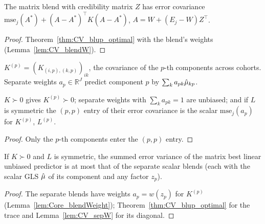 \begin{theorem}\label{thm:CV_blend_price}
  \leanok
  The matrix blend with credibility matrix $Z$ has error covariance
  $\mathrm{mse}_j(A^\ast) + (A - A^\ast)^\top K(A - A^\ast)$, $A = W + (E_j - W)Z^\top$.
\end{theorem}
\begin{proof}
  \leanok
  Theorem~\ref{thm:CV_blup_optimal} with the blend's weights (Lemma~\ref{lem:CV_blendW}).
\end{proof}

\begin{definition}\label{def:CV_sepW}
  \leanok
  $K^{(p)} = (K_{(i,p),(k,p)})_{ik}$, the covariance of the $p$-th components across
  cohorts. Separate weights $a_p \in \mathbb{R}^J$ predict component $p$ by
  $\sum_k a_{pk}\hat\mu_{kp}$.
\end{definition}

\begin{lemma}\label{lem:CV_sepW}
  \leanok
  $K \succ 0$ gives $K^{(p)} \succ 0$; separate weights with $\sum_k a_{pk} = 1$ are
  unbiased; and if $L$ is symmetric the $(p,p)$ entry of their error covariance is the
  scalar $\mathrm{mse}_j(a_p)$ for $K^{(p)}$, $L^{(p)}$.
\end{lemma}
\begin{proof}
  \leanok
  Only the $p$-th components enter the $(p,p)$ entry.
\end{proof}

\begin{theorem}\label{thm:CV_beats_separate}
  \leanok
  If $K \succ 0$ and $L$ is symmetric, the summed error variance of the matrix best linear
  unbiased predictor is at most that of the separate scalar blends (each with the scalar
  GLS $\hat\mu$ of its component and any factor $z_p$).
\end{theorem}
\begin{proof}
  \leanok
  The separate blends have weights $a_p = w(z_p)$ for $K^{(p)}$
  (Lemma~\ref{lem:Core_blendWeight}); Theorem~\ref{thm:CV_blup_optimal} for the trace and
  Lemma~\ref{lem:CV_sepW} for its diagonal.
\end{proof}

